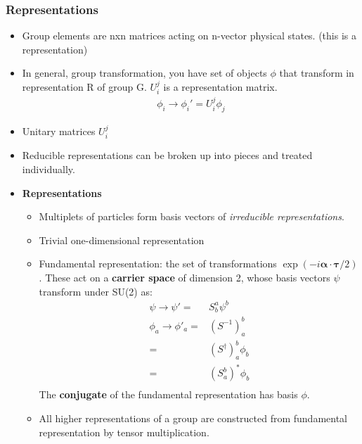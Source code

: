 \subsubsection{Representations}
\begin{itemize}
    \item Group elements are nxn matrices acting on n-vector physical states. (this is a representation) \cite{wells}
        \item In general, group transformation, you have set of objects $\phi$ that transform in representation R of group G. $U_i^j$ is a representation matrix. \cite{wells}
        \begin{equation}\begin{split}
        \phi_i\to\phi_i'=U_i^j\phi_j
        \end{split}\end{equation}
        \item Unitary matrices $U_i^j$  \cite{wells}
        \item Reducible representations can be broken up into pieces and treated individually. \cite{wells}
    \item \textbf{Representations} \cite{hokim}
    \begin{itemize}
        \item Multiplets of particles form basis vectors of \emph{irreducible representations}. \cite{hokim}
        \item Trivial one-dimensional representation \cite{hokim}
        \item Fundamental representation: the set of transformations ${\exp(-i\pmb\alpha\cdot\pmb\tau/2)}$. These act on a \textbf{carrier space} of dimension 2, whose basis vectors $\psi$ transform under SU(2) as: \cite{hokim}
        \begin{equation}\begin{split}
        \psi\to\psi'=&S^a_b\psi^b\\
        \phi_a\to\phi'_a=&(S^{-1})^b_a\\
        =&(S^\dagger)^b_a\phi_b \\
        =&(S^b_a)^*\phi_b \\
        \end{split}\end{equation}
        The \textbf{conjugate} of the fundamental representation has basis $\phi$.
        \item All higher representations of a group are constructed from fundamental representation by tensor multiplication. \cite{hokim}

\end{itemize}
\end{itemize}
